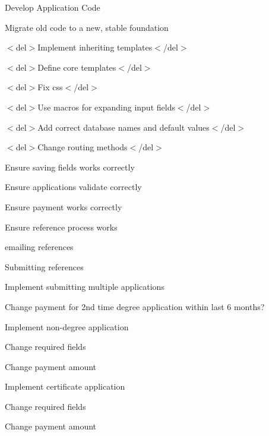 \begin{DoxyItemize}
\item Develop Application Code
\begin{DoxyItemize}
\item Migrate old code to a new, stable foundation
\begin{DoxyItemize}
\item $<$del$>$Implement inheriting templates$<$/del$>$
\begin{DoxyItemize}
\item $<$del$>$Define core templates$<$/del$>$
\item $<$del$>$Fix css$<$/del$>$
\item $<$del$>$Use macros for expanding input fields$<$/del$>$
\item $<$del$>$Add correct database names and default values$<$/del$>$
\end{DoxyItemize}
\item $<$del$>$Change routing methods$<$/del$>$
\item Ensure saving fields works correctly
\item Ensure applications validate correctly
\item Ensure payment works correctly
\item Ensure reference process works
\begin{DoxyItemize}
\item emailing references
\item Submitting references
\end{DoxyItemize}
\end{DoxyItemize}
\end{DoxyItemize}


\begin{DoxyItemize}
\item Implement submitting multiple applications
\begin{DoxyItemize}
\item Change payment for 2nd time degree application within last 6 months?
\end{DoxyItemize}
\end{DoxyItemize}


\begin{DoxyItemize}
\item Implement non-\/degree application
\begin{DoxyItemize}
\item Change required fields
\item Change payment amount
\end{DoxyItemize}
\end{DoxyItemize}


\begin{DoxyItemize}
\item Implement certificate application
\begin{DoxyItemize}
\item Change required fields
\item Change payment amount
\end{DoxyItemize}
\end{DoxyItemize}
\end{DoxyItemize}


